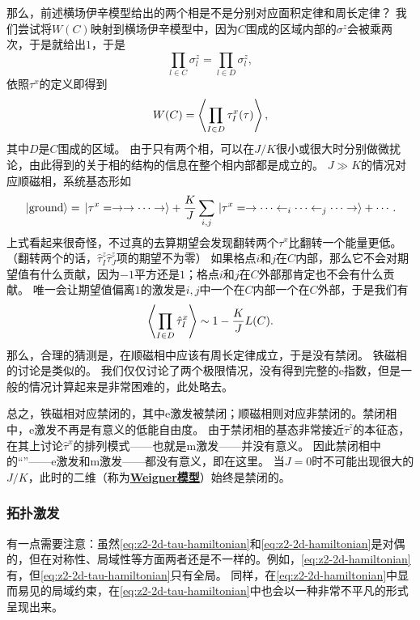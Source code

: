 \documentclass[hyperref, UTF8, a4paper]{ctexart}
\newcommand*{\ee}{\mathrm{e}}
\newcommand*{\concept}[1]{\underline{\textbf{#1}}}
\newcommand*{\Ztwo}{$\mathbb{Z}_2$}
\begin{document}
那么，前述横场伊辛模型给出的两个相是不是分别对应面积定律和周长定律？
我们尝试将$W(C)$映射到横场伊辛模型中，因为$C$围成的区域内部的$\sigma^z$会被乘两次，于是就给出$1$，于是
\[
    \prod_{l \in C} \sigma^z_l = \prod_{l \in D} \sigma^z_l,
\]
依照$\tau^x$的定义即得到
\begin{equation}
    W(C) = \expval{\prod_{I \in D} \tau^x_I(\tau)},
\end{equation}
其中$D$是$C$围成的区域。
由于只有两个相，可以在$J/K$很小或很大时分别做微扰论，由此得到的关于相的结构的信息在整个相内部都是成立的。
$J \gg K$的情况对应顺磁相，系统基态形如
\[
    \ket*{\text{ground}} = \ket*{\tau^x = \rightarrow \rightarrow \cdots \rightarrow} + \frac{K}{J} \sum_{i, j} \ket*{\tau^x = \rightarrow \cdots \leftarrow_i \cdots \leftarrow_j \cdots \rightarrow} + \cdots.
\]
上式看起来很奇怪，不过真的去算期望会发现翻转两个$\tau^x$比翻转一个能量更低。（翻转两个的话，$\hat{\tau}^z_I \hat{\tau}^z_J$项的期望不为零）
如果格点$i$和$j$在$C$内部，那么它不会对期望值有什么贡献，因为$-1$平方还是$1$；格点$i$和$j$在$C$外部那肯定也不会有什么贡献。
唯一会让期望值偏离$1$的激发是$i, j$中一个在$C$内部一个在$C$外部，于是我们有
\[
    \expval{\prod_{I \in D} \hat{\tau}^x_I} \sim 1 - \frac{K}{J} L(C).
\]
那么，合理的猜测是，在顺磁相中应该有周长定律成立，于是没有禁闭。
铁磁相的讨论是类似的。 %
我们仅仅讨论了两个极限情况，没有得到完整的$\ee$指数，但是一般的情况计算起来是非常困难的，此处略去。

总之，铁磁相对应禁闭的，其中e激发被禁闭；顺磁相则对应非禁闭的。禁闭相中，e激发不再是有意义的低能自由度。
由于禁闭相的基态非常接近$\hat{\tau}^z$的本征态，在其上讨论$\hat{\tau}^x$的排列模式——也就是m激发——并没有意义。
因此禁闭相中的“”——e激发和m激发——都没有意义，即在这里。
当$J=0$时不可能出现很大的$J/K$，此时的二维（称为\concept{Weigner模型}）始终是禁闭的。

\subsubsection{拓扑激发}

有一点需要注意：虽然\eqref{eq:z2-2d-tau-hamiltonian}和\eqref{eq:z2-2d-hamiltonian}是对偶的，但在对称性、局域性等方面两者还是不一样的。例如，\eqref{eq:z2-2d-hamiltonian}有，但\eqref{eq:z2-2d-tau-hamiltonian}只有全局。
同样，在\eqref{eq:z2-2d-hamiltonian}中显而易见的局域约束，在\eqref{eq:z2-2d-tau-hamiltonian}中也会以一种非常不平凡的形式呈现出来。
\end{document}
